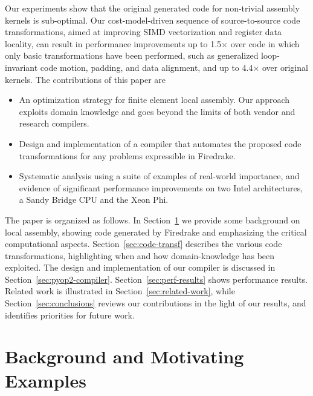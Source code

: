 \documentclass[conference]{IEEEtran}
\begin{document}
Our experiments show that the original generated code for non-trivial assembly kernels is sub-optimal. Our cost-model-driven sequence of source-to-source code transformations, aimed at improving SIMD vectorization and register data locality, can result in performance improvements up to 1.5$\times$ over code in which only basic transformations have been performed, such as generalized loop-invariant code motion, padding, and data alignment, and up to 4.4$\times$ over original kernels. The contributions of this paper are
\begin{itemize}
\item An optimization strategy for finite element local assembly. Our approach exploits domain knowledge and goes beyond the limits of both vendor and research compilers.
\item Design and implementation of a compiler that automates the proposed code transformations for any problems expressible in Firedrake.
\item Systematic analysis using a suite of examples of real-world importance, and evidence of significant performance improvements on two Intel architectures, a Sandy Bridge CPU and the Xeon Phi.
\end{itemize}

The paper is organized as follows. In Section~\ref{sec:background} we provide some background on local assembly, showing code generated by Firedrake and emphasizing the critical computational aspects. Section~\ref{sec:code-transf} describes the various code transformations, highlighting when and how domain-knowledge has been exploited. The design and implementation of our compiler is discussed in Section~\ref{sec:pyop2-compiler}. Section~\ref{sec:perf-results} shows performance results. Related work is illustrated in Section~\ref{sec:related-work}, while Section~\ref{sec:conclusions} reviews our contributions in the light of our results, and identifies priorities for future work.



\section{Background and Motivating Examples}
\label{sec:background}
\end{document}
